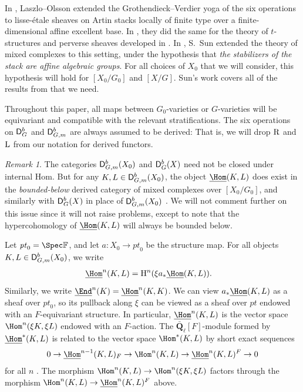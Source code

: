 \documentclass[a4paper,10pt,leqno]{amsart}
\theoremstyle{plain}
\theoremstyle{plain}
\theoremstyle{plain}
\theoremstyle{definition}
\theoremstyle{remark}
\newtheorem{rem}[thm]{Remark}
\newcommand{\QL}{\bar{\mathbf{Q}}_\ell}
\newcommand{\point}{\mathit{pt}}
\begin{document}
In \cite{lo_2008}, Laszlo--Olsson extended the Grothendieck--Verdier yoga of the six operations to lisse-\'etale sheaves on Artin stacks locally of finite type over a finite-dimensional affine excellent base.
In \cite{lo_2009}, they did the same for the theory of $t$-structures and perverse sheaves developed in \cite[Ch.\ 1-2]{bbd}.
In \cite{sun}, S.\ Sun extended the theory of mixed complexes to this setting, under the hypothesis that \emph{the stabilizers of the stack are affine algebraic groups}.
For all choices of $X_0$ that we will consider, this hypothesis will hold for $[X_0/G_0]$ and $[X/G]$.
Sun's work covers all of the results from \cite[Ch.\ 5]{bbd} that we need.

Throughout this paper, all maps between $G_0$-varieties or $G$-varieties will be equivariant and compatible with the relevant stratifications.
The six operations on $\sf{D}_G^b$ and $\sf{D}_{G, m}^b$ are always assumed to be derived:
That is, we will drop $\ur{R}$ and $\ur{L}$ from our notation for derived functors.

\begin{rem}\label{rem:bounded-below}
The categories $\sf{D}_{G, m}^b(X_0)$ and $\sf{D}_G^b(X)$ need not be closed under internal Hom.
But for any $K, L \in \sf{D}_{G, m}^b(X_0)$, the object $\SHom(K, L)$ does exist in the \emph{bounded-below} derived category of mixed complexes over $[X_0/G_0]$, and similarly with $\sf{D}_G^b(X)$ in place of $\sf{D}_{G, m}^b(X_0)$ \cite{lo_2008}.
We will not comment further on this issue since it will not raise problems, except to note that the hypercohomology of $\SHom(K, L)$ will always be bounded below.
\end{rem}

Let $\point_0 = \Spec \bb{F}$, and let $a : X_0 \to \point_0$ be the structure map.
For all objects $K, L \in \sf{D}_{G, m}^b(X_0)$, we write
\begin{align}
\SHom^n(K, L) &= \ur{H}^n(\xi a_\ast \SHom(K, L)).
\end{align}
Similarly, we write $\SEnd^n(K) = \SHom^n(K, K)$.
We can view $a_\ast \SHom(K, L)$ as a sheaf over $\point_0$, so its pullback along $\xi$ can be viewed as a sheaf over $\point$ endowed with an $F$-equivariant structure.
In particular, $\SHom^n(K, L)$ is the vector space $\Hom^n(\xi K, \xi L)$ endowed with an $F$-action.
The $\QL[F]$-module formed by $\SHom^\ast(K, L)$ is related to the vector space $\Hom^\ast(K, L)$ by short exact sequences
\begin{align}\label{eq:bbd}
0 \to \SHom^{n - 1}(K, L)_F \to \Hom^n(K, L) \to \SHom^n(K, L)^F \to 0
\end{align}
for all $n$ \cite[(5.1.2.5)]{bbd}.
The morphism $\Hom^n(K, L) \to \Hom^n(\xi K, \xi L)$ factors through the morphism $\Hom^n(K, L) \to \SHom^n(K, L)^F$ above.
\end{document}
